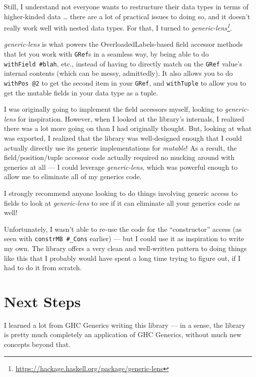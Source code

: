 \documentclass[]{article}
\renewcommand{\href}[2]{#2\footnote{\url{#1}}}
\begin{document}
Still, I understand not everyone wants to restructure their data types in terms
of higher-kinded data \ldots{} there are a lot of practical issues to doing so,
and it doesn't really work well with nested data types. For that, I turned to
\emph{\href{https://hackage.haskell.org/package/generic-lens}{generic-lens}}.

\emph{generic-lens} is what powers the OverloadedLabels-based field accessor
methods that let you work with \texttt{GRef}s in a seamless way, by being able
to do \texttt{withField\ \#blah}, etc., instead of having to directly match on
the \texttt{GRef} value's internal contents (which can be messy, admittedly). It
also allows you to do \texttt{withPos\ @2} to get the second item in your
\texttt{GRef}, and \texttt{withTuple} to allow you to get the mutable fields in
your data type as a tuple.

I was originally going to implement the field accessors myself, looking to
\emph{generic-lens} for inspiration. However, when I looked at the library's
internals, I realized there was a lot more going on than I had originally
thought. But, looking at what was exported, I realized that the library was
well-designed enough that I could actually directly use its generic
implementations for \emph{mutable}! As a result, the field/position/tuple
accessor code actually required no mucking around with generics at all --- I
could leverage \emph{generic-lens}, which was powerful enough to allow me to
eliminate all of my generics code.

I strongly recommend anyone looking to do things involving generic access to
fields to look at \emph{generic-lens} to see if it can eliminate all your
generics code as well!

Unfortunately, I wasn't able to re-use the code for the ``constructor'' access
(as seen with \texttt{constrMB\ \#\_Cons} earlier) --- but I could use it as
inspiration to write my own. The library offers a very clean and well-written
pattern to doing things like this that I probably would have spent a long time
trying to figure out, if I had to do it from scratch.

\section{Next Steps}\label{next-steps}

I learned a lot from GHC Generics writing this library --- in a sense, the
library is pretty much completely an application of GHC Generics, without much
new concepts beyond that.
\end{document}
